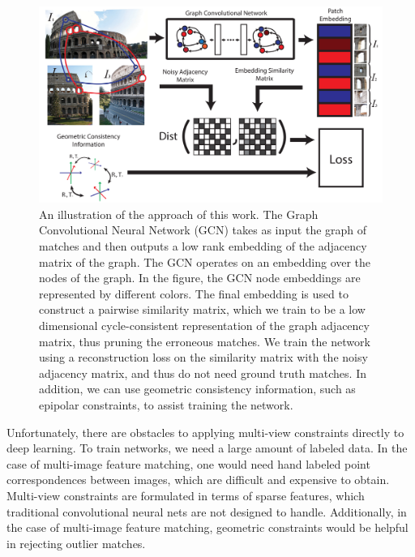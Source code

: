 \documentclass[10pt,twocolumn,letterpaper]{article}
\begin{document}
\begin{figure}[t]
\begin{center}
  \includegraphics[width=0.8\linewidth]{figures-CycleConsistencyMainFigure-v2.pdf}
\end{center}
  \caption{
    An illustration of the approach of this work.
    The Graph Convolutional Neural Network (GCN) \cite{kipf2016semi} takes as input the graph of matches and then outputs a low rank embedding of the adjacency matrix of the graph.
    The GCN operates on an embedding over the nodes of the graph.
    In the figure, the GCN node embeddings are represented by different colors.
    The final embedding is used to construct a pairwise similarity matrix, which we train to be a low dimensional cycle-consistent representation of the graph adjacency matrix, thus pruning the erroneous matches.
    We train the network using a reconstruction loss on the similarity matrix with the noisy adjacency matrix, and thus do not need ground truth matches.
    In addition, we can use geometric consistency information, such as epipolar constraints, to assist training the network.
  }
\label{fig:pipeline}
\label{fig:onecol}
\end{figure}

Unfortunately, there are obstacles to applying multi-view constraints directly to deep learning. 
To train networks, we need a large amount of labeled data.
In the case of multi-image feature matching, one would need hand labeled point correspondences between images, which are difficult and expensive to obtain.
Multi-view constraints are formulated in terms of sparse features, which traditional convolutional neural nets are not designed to handle.
Additionally, in the case of multi-image feature matching, geometric constraints would be helpful in rejecting outlier matches.
\end{document}
